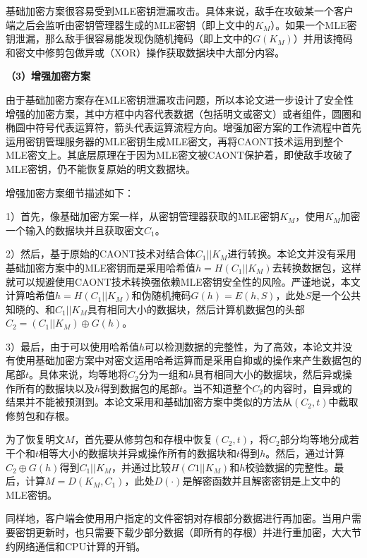\documentclass[promaster]{thesis-uestc}
\begin{document}
基础加密方案很容易受到MLE密钥泄漏攻击。具体来说，敌手在攻破某一个客户端之后会监听由密钥管理器生成的MLE密钥（即上文中的$K_M$）。如果一个MLE密钥泄漏，那么敌手很容易能发现伪随机掩码（即上文中的$G(K_M)$）并用该掩码和密文中修剪包做异或（XOR）操作获取数据块中大部分内容。

\textbf{（3）增强加密方案}\label{caont-enhanced}

由于基础加密方案存在MLE密钥泄漏攻击问题，所以本论文进一步设计了安全性增强的加密方案，其中方框中内容代表数据（包括明文或密文）或者组件，圆圈和椭圆中符号代表运算符，箭头代表运算流程方向。增强加密方案的工作流程中首先运用密钥管理服务器的MLE密钥生成MLE密文，再将CAONT技术运用到整个MLE密文上。其底层原理在于因为MLE密文被CAONT保护着，即使敌手攻破了MLE密钥，仍不能恢复原始的明文数据块。

增强加密方案细节描述如下：

1）首先，像基础加密方案一样，从密钥管理器获取的MLE密钥$K_M$，使用$K_M$加密一个输入的数据块并且获取密文$C_1$。

2）然后，基于原始的CAONT技术对结合体$C_1||K_M$进行转换。本论文并没有采用基础加密方案中的MLE密钥而是采用哈希值$h =  H(C_1||K_M)$去转换数据包，这样就可以规避使用CAONT技术转换强依赖MLE密钥安全性的风险。严谨地说，本文计算哈希值$h = H(C_1||K_M)$和伪随机掩码$G(h) = E(h, S)$，此处$S$是一个公共知晓的、和$C_1||K_M$具有相同大小的数据块，然后计算机数据包的头部$C_2 = (C_1||K_M) \oplus G(h)$。

3）最后，由于可以使用哈希值$h$可以检测数据的完整性，为了高效，本论文并没有使用基础加密方案中对密文运用哈希运算而是采用自抑或的操作来产生数据包的尾部$t$。具体来说，均等地将$C_2$分为一组和$h$具有相同大小的数据块，然后异或操作所有的数据块以及$h$得到数据包的尾部$t$。当不知道整个$C_2$的内容时，自异或的结果并不能被预测到。本论文采用和基础加密方案中类似的方法从$(C_2, t)$中截取修剪包和存根。

为了恢复明文$M$，首先要从修剪包和存根中恢复$(C_2, t)$，将$C_2$部分均等地分成若干个和$t$相等大小的数据块并异或操作所有的数据块和$t$得到$h$。然后，通过计算$C_2 \oplus G(h)$得到$C_1||K_M$，并通过比较$H(C1||K_M)$和$h$校验数据的完整性。最后，计算$M = D(K_M, C_1)$，此处$D(\cdot)$是解密函数并且解密密钥是上文中的MLE密钥。

同样地，客户端会使用用户指定的文件密钥对存根部分数据进行再加密。当用户需要密钥更新时，也只需要下载少部分数据（即所有的存根）并进行重加密，大大节约网络通信和CPU计算的开销。
\end{document}
